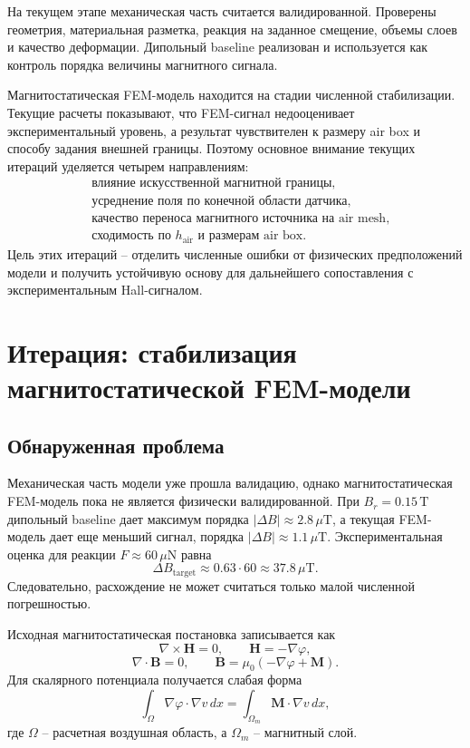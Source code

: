 \documentclass[12pt,a4paper]{article}
\begin{document}
На текущем этапе механическая часть считается валидированной. Проверены
геометрия, материальная разметка, реакция на заданное смещение, объемы слоев и
качество деформации. Дипольный baseline реализован и используется как контроль
порядка величины магнитного сигнала.

Магнитостатическая FEM-модель находится на стадии численной стабилизации.
Текущие расчеты показывают, что FEM-сигнал недооценивает экспериментальный
уровень, а результат чувствителен к размеру air box и способу задания внешней
границы. Поэтому основное внимание текущих итераций уделяется четырем
направлениям:
\[
\begin{aligned}
&\text{влияние искусственной магнитной границы},\\
&\text{усреднение поля по конечной области датчика},\\
&\text{качество переноса магнитного источника на air mesh},\\
&\text{сходимость по } h_{\mathrm{air}} \text{ и размерам air box}.
\end{aligned}
\]
Цель этих итераций -- отделить численные ошибки от физических предположений
модели и получить устойчивую основу для дальнейшего сопоставления с
экспериментальным Hall-сигналом.

\section{Итерация: стабилизация магнитостатической FEM-модели}

\subsection*{Обнаруженная проблема}

Механическая часть модели уже прошла валидацию, однако магнитостатическая FEM-модель
пока не является физически валидированной. При \(B_r=0.15\,\mathrm{T}\) дипольный
baseline дает максимум порядка \(|\Delta B|\approx 2.8\,\mu\mathrm{T}\), а текущая
FEM-модель дает еще меньший сигнал, порядка \(|\Delta B|\approx 1.1\,\mu\mathrm{T}\).
Экспериментальная оценка для реакции \(F\approx 60\,\mu\mathrm{N}\) равна
\[
    \Delta B_{\mathrm{target}} \approx 0.63 \cdot 60
    \approx 37.8\,\mu\mathrm{T}.
\]
Следовательно, расхождение не может считаться только малой численной погрешностью.

Исходная магнитостатическая постановка записывается как
\[
    \nabla \times \mathbf H = 0,\qquad
    \mathbf H = -\nabla \varphi,
\]
\[
    \nabla \cdot \mathbf B = 0,\qquad
    \mathbf B = \mu_0(-\nabla\varphi + \mathbf M).
\]
Для скалярного потенциала получается слабая форма
\[
    \int_\Omega \nabla\varphi \cdot \nabla v\,dx
    =
    \int_{\Omega_m} \mathbf M\cdot \nabla v\,dx,
\]
где \(\Omega\) -- расчетная воздушная область, а \(\Omega_m\) -- магнитный слой.
\end{document}
